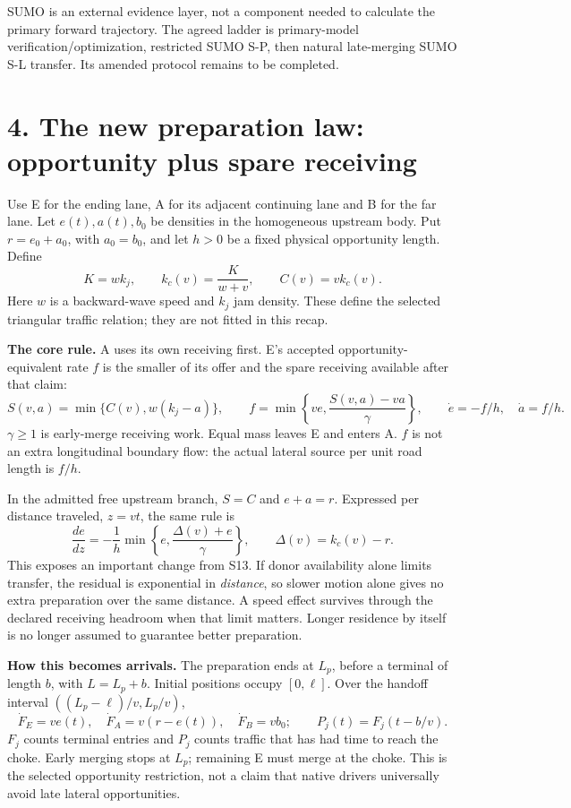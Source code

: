 \documentclass[11pt,a4paper]{article}
\begin{document}
SUMO is an external evidence layer, not a component needed to calculate
the primary forward trajectory. The agreed ladder is primary-model
verification/optimization, restricted SUMO S-P, then natural late-merging
SUMO S-L transfer. Its amended protocol remains to be completed.

\newpage
\section*{4. The new preparation law: opportunity plus spare receiving}
Use E for the ending lane, A for its adjacent continuing lane and B for
the far lane. Let $e(t),a(t),b_0$ be densities in the homogeneous upstream
body. Put $r=e_0+a_0$, with $a_0=b_0$, and let $h>0$ be a fixed physical
opportunity length. Define
\[
 K=wk_j,\qquad k_c(v)=\frac{K}{w+v},\qquad C(v)=v k_c(v).
\]
Here $w$ is a backward-wave speed and $k_j$ jam density. These define the
selected triangular traffic relation; they are not fitted in this recap.

\textbf{The core rule.} A uses its own receiving first. E's accepted
opportunity-equivalent rate $f$ is the smaller of its offer and the spare
receiving available after that claim:
\[
 S(v,a)=\min\{C(v),w(k_j-a)\},\qquad
 f=\min\left\{ve,\frac{S(v,a)-va}{\gamma}\right\},\qquad
 \dot e=-f/h,\quad\dot a=f/h.
\]
$\gamma\geq1$ is early-merge receiving work. Equal mass leaves E and enters
A. $f$ is not an extra longitudinal boundary flow: the actual lateral
source per unit road length is $f/h$.

In the admitted free upstream branch, $S=C$ and $e+a=r$. Expressed per
distance traveled, $z=vt$, the same rule is
\[
 \frac{de}{dz}=-\frac1h\min\left\{e,
          \frac{\Delta(v)+e}{\gamma}\right\},\qquad
 \Delta(v)=k_c(v)-r.
\]
This exposes an important change from S13. If donor availability alone
limits transfer, the residual is exponential in \emph{distance}, so slower
motion alone gives no extra preparation over the same distance. A speed
effect survives through the declared receiving headroom when that limit
matters. Longer residence by itself is no longer assumed to guarantee
better preparation.

\textbf{How this becomes arrivals.} The preparation ends at $L_p$, before
a terminal of length $b$, with $L=L_p+b$. Initial positions occupy
$[0,\ell]$. Over the handoff interval
$((L_p-\ell)/v,L_p/v)$,
\[
 \dot F_E=ve(t),\quad \dot F_A=v(r-e(t)),\quad\dot F_B=vb_0;
 \qquad P_j(t)=F_j(t-b/v).
\]
$F_j$ counts terminal entries and $P_j$ counts traffic that has had time
to reach the choke. Early merging stops at $L_p$; remaining E must merge
at the choke. This is the selected opportunity restriction, not a claim
that native drivers universally avoid late lateral opportunities.
\end{document}
